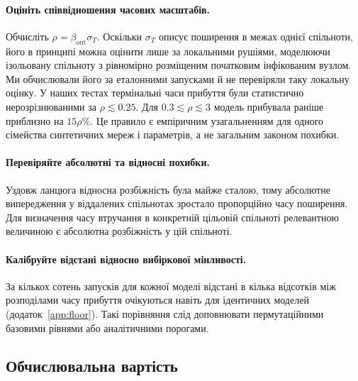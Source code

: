 \paragraph{Оцініть співвідношення часових масштабів.}
Обчисліть $\rho=\beta_{\mathrm{out}}\sigma_T$. Оскільки $\sigma_T$ описує поширення в межах однієї спільноти, його в принципі можна оцінити лише за локальними рушіями, моделюючи ізольовану спільноту з рівномірно розміщеним початковим інфікованим вузлом. Ми обчислювали його за еталонними запусками й не перевіряли таку локальну оцінку. У наших тестах термінальні часи прибуття були статистично нерозрізнюваними за $\rho\lesssim0.25$. Для $0.3\lesssim\rho\lesssim3$ модель \TS{} прибувала раніше приблизно на $15\rho\%$. Це правило є емпіричним узагальненням для одного сімейства синтетичних мереж і параметрів, а не загальним законом похибки.

\paragraph{Перевіряйте абсолютні та відносні похибки.}
Уздовж ланцюга відносна розбіжність була майже сталою, тому абсолютне випередження у віддалених спільнотах зростало пропорційно часу поширення. Для визначення часу втручання в конкретній цільовій спільноті релевантною величиною є абсолютна розбіжність у цій спільноті.

\paragraph{Калібруйте відстані відносно вибіркової мінливості.}
За кількох сотень запусків для кожної моделі відстані в кілька відсотків між розподілами часу прибуття очікуються навіть для ідентичних моделей (додаток~\ref{app:floor}). Такі порівняння слід доповнювати пермутаційними базовими рівнями або аналітичними порогами.

\subsection{Обчислювальна вартість}
\label{sec:disc_cost}

